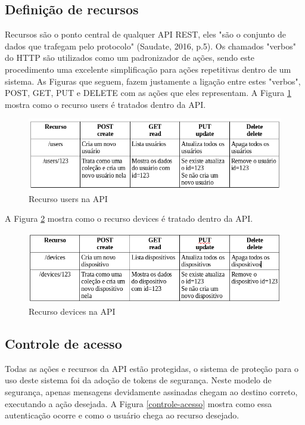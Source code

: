 \subsection{Definição de recursos}
Recursos são o ponto central de qualquer API REST, eles "são o conjunto de dados que trafegam pelo protocolo" (Saudate, 2016, p.5). Os chamados "verbos" do HTTP são utilizados como um padronizador de ações, sendo este procedimento uma excelente simplificação para ações repetitivas dentro de um sistema. As Figuras que seguem, fazem justamente a ligação entre estes "verbos", POST, GET, PUT e DELETE com as ações que eles representam. A Figura \ref{recurso-users} mostra como o recurso users é tratados dentro da API.

\begin{figure}[H]
\caption{\label{recurso-users} Recurso users na API}
\includegraphics[scale=0.5]{img/recurso-users.png}
\end{figure}

A Figura \ref{recurso-devices} mostra como o recurso devices é tratado dentro da API.

\begin{figure}[H]
\caption{\label{recurso-devices} Recurso devices na API}
\includegraphics[scale=0.5]{img/resurso-devices.png}
\end{figure}

\subsection{Controle de acesso}
Todas as ações e recursos da API estão protegidas, o sistema de proteção para o uso deste sistema foi da adoção de tokens de segurança. Neste modelo de segurança, apenas mensagens devidamente assinadas chegam ao destino correto, executando a ação desejada. A Figura \ref{controle-acesso} mostra como essa autenticação ocorre e como o usuário chega ao recurso desejado.

